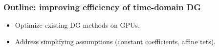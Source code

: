 \documentclass[compress]{beamer}
\begin{document}
\begin{frame}[noframenumbering]

\frametitle{Outline: improving efficiency of time-domain DG}
    
\begin{itemize}
\item Optimize existing DG methods on GPUs.  
\vspace{.5em}
\item Address simplifying assumptions (constant coefficients, affine tets).
\end{itemize}
\vspace{1em}


\end{frame}
\end{document}
